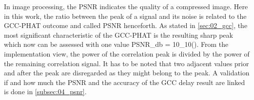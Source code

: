In image processing, the \acf{PSNR} indicates the quality of a compressed
image. Here in this work, the ratio between the peak of a signal
and its noise is related to the \ac{GCC-PHAT} outcome and called \ac{PSNR}
henceforth.
As stated in \cref{sec:02_gcc}, the most significant characteristic
of the \ac{GCC-PHAT} is the resulting sharp peak which now can be
assessed with one value
\bal
    PSNR_{db} = 10\log_{10}().
    \label{eq:03_psnr}
\eal
From the implementation view, the power of the correlation peak is divided by
the power of the remaining correlation signal.
It has to be noted that two adjacent values prior and after the peak
are disregarded as they might belong to the peak.
A validation if and how much the \ac{PSNR} and the accuracy of the \ac{GCC}
delay result are linked is done in \cref{subsec:04_psnr}.